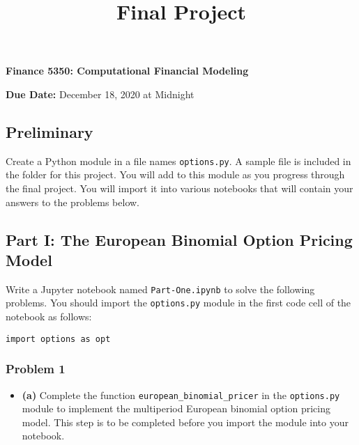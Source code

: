 \documentclass[
]{article}
\title{Final Project}
\author{}
\date{\vspace{-2.5em}}
\providecommand{\tightlist}{%
  \setlength{\itemsep}{0pt}\setlength{\parskip}{0pt}}
\begin{document}
\maketitle

\textbf{Finance 5350: Computational Financial Modeling}

\textbf{Due Date:} December 18, 2020 at Midnight

\hypertarget{preliminary}{%
\subsection{\texorpdfstring{\textbf{Preliminary}}{Preliminary}}\label{preliminary}}

Create a Python module in a file names \texttt{options.py}. A sample
file is included in the folder for this project. You will add to this
module as you progress through the final project. You will import it
into various notebooks that will contain your answers to the problems
below.

\hypertarget{part-i-the-european-binomial-option-pricing-model}{%
\subsection{\texorpdfstring{\textbf{Part I: The European Binomial Option
Pricing
Model}}{Part I: The European Binomial Option Pricing Model}}\label{part-i-the-european-binomial-option-pricing-model}}

Write a Jupyter notebook named \texttt{Part-One.ipynb} to solve the
following problems. You should import the \texttt{options.py} module in
the first code cell of the notebook as follows:

\begin{verbatim}
import options as opt
\end{verbatim}

\hypertarget{problem-1}{%
\subsubsection{\texorpdfstring{\textbf{Problem
1}}{Problem 1}}\label{problem-1}}

\begin{itemize}
\tightlist
\item
  \textbf{(a)} Complete the function \texttt{european\_binomial\_pricer}
  in the \texttt{options.py} module to implement the multiperiod
  European binomial option pricing model. This step is to be completed
  before you import the module into your notebook.
\end{itemize}
\end{document}
